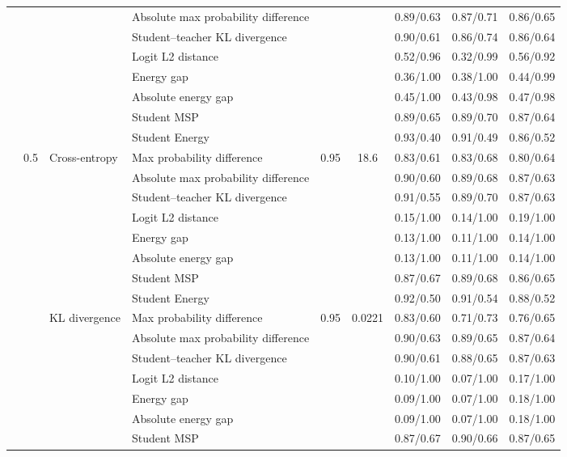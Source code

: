 \documentclass[border=2pt]{standalone}
\begin{document}
\begin{tabular}{llllccccc}
 &  &  & Absolute max probability difference &  &  & 0.89/0.63 & 0.87/0.71 & 0.86/0.65 \\
 &  &  & Student--teacher KL divergence &  &  & 0.90/0.61 & 0.86/0.74 & 0.86/0.64 \\
 &  &  & Logit L2 distance &  &  & 0.52/0.96 & 0.32/0.99 & 0.56/0.92 \\
 &  &  & Energy gap &  &  & 0.36/1.00 & 0.38/1.00 & 0.44/0.99 \\
 &  &  & Absolute energy gap &  &  & 0.45/1.00 & 0.43/0.98 & 0.47/0.98 \\
 &  &  & Student MSP &  &  & 0.89/0.65 & 0.89/0.70 & 0.87/0.64 \\
 &  &  & Student Energy &  &  & 0.93/0.40 & 0.91/0.49 & 0.86/0.52 \\
\addlinespace
 & 0.5 & Cross-entropy & Max probability difference & 0.95 & 18.6 & 0.83/0.61 & 0.83/0.68 & 0.80/0.64 \\
 &  &  & Absolute max probability difference &  &  & 0.90/0.60 & 0.89/0.68 & 0.87/0.63 \\
 &  &  & Student--teacher KL divergence &  &  & 0.91/0.55 & 0.89/0.70 & 0.87/0.63 \\
 &  &  & Logit L2 distance &  &  & 0.15/1.00 & 0.14/1.00 & 0.19/1.00 \\
 &  &  & Energy gap &  &  & 0.13/1.00 & 0.11/1.00 & 0.14/1.00 \\
 &  &  & Absolute energy gap &  &  & 0.13/1.00 & 0.11/1.00 & 0.14/1.00 \\
 &  &  & Student MSP &  &  & 0.87/0.67 & 0.89/0.68 & 0.86/0.65 \\
 &  &  & Student Energy &  &  & 0.92/0.50 & 0.91/0.54 & 0.88/0.52 \\
\addlinespace
 &  & KL divergence & Max probability difference & 0.95 & 0.0221 & 0.83/0.60 & 0.71/0.73 & 0.76/0.65 \\
 &  &  & Absolute max probability difference &  &  & 0.90/0.63 & 0.89/0.65 & 0.87/0.64 \\
 &  &  & Student--teacher KL divergence &  &  & 0.90/0.61 & 0.88/0.65 & 0.87/0.63 \\
 &  &  & Logit L2 distance &  &  & 0.10/1.00 & 0.07/1.00 & 0.17/1.00 \\
 &  &  & Energy gap &  &  & 0.09/1.00 & 0.07/1.00 & 0.18/1.00 \\
 &  &  & Absolute energy gap &  &  & 0.09/1.00 & 0.07/1.00 & 0.18/1.00 \\
 &  &  & Student MSP &  &  & 0.87/0.67 & 0.90/0.66 & 0.87/0.65 \\

\end{tabular}
\end{document}
